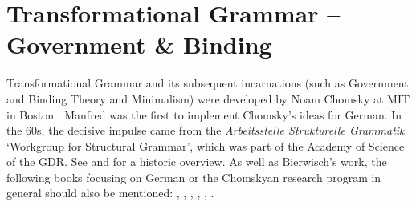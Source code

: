 
\chapter{Transformational Grammar -- Government \& Binding}
\label{Kapitel-GB}\label{chap-GB}\label{chap-gb}

Transformational Grammar and its subsequent incarnations (such as Government and Binding Theory
and Minimalism) were developed by Noam Chomsky at MIT in Boston \citep{Chomsky57a,Chomsky65a,Chomsky75a,Chomsky81a,Chomsky86b,Chomsky95a-u}.
Manfred \citet{Bierwisch63a} was the first to implement Chomsky's ideas for German. In the 60s, the decisive impulse came from the 
\emph{Arbeitsstelle Strukturelle Grammatik} `Workgroup for Structural Grammar', which was part of the Academy of Science of the GDR. See
\citealp{Bierwisch92} and \citealp{Vater2010a} for a historic overview.
As well as Bierwisch's work, the following books focusing on German or the Chomskyan research
program in general should also be mentioned: , , ,
, , .

